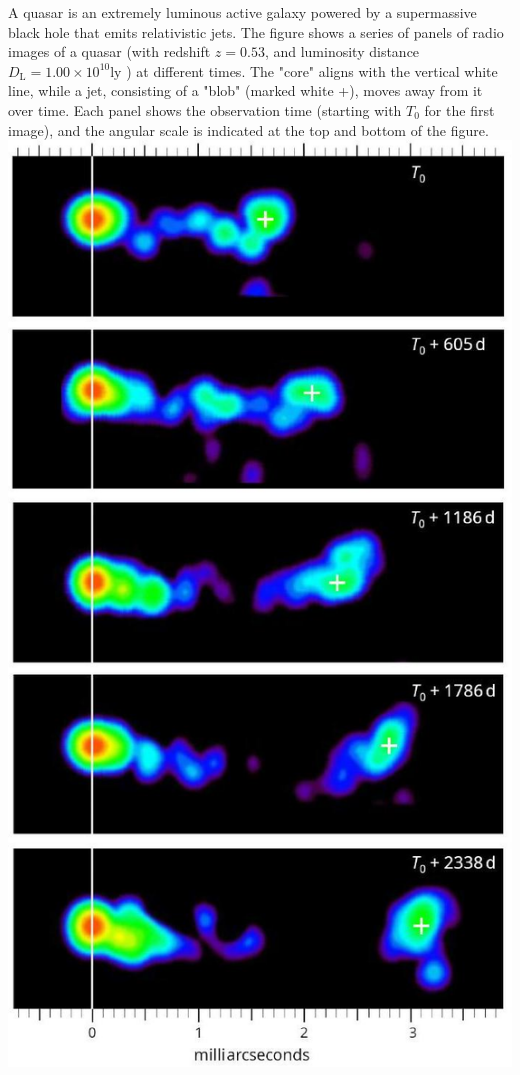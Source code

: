 \documentclass[10pt]{article}
\begin{document}
    A quasar is an extremely luminous active galaxy powered by a supermassive black hole that emits relativistic jets. The figure shows a series of panels of radio images of a quasar (with redshift $z=0.53$, and luminosity distance $D_{\mathrm{L}}=1.00 \times 10^{10} \mathrm{ly}$ ) at different times. The "core" aligns with the vertical white line, while a jet, consisting of a "blob" (marked white +), moves away from it over time. Each panel shows the observation time (starting with $T_{0}$ for the first image), and the angular scale is indicated at the top and bottom of the figure.\\
    \includegraphics[max width=\textwidth, center]{2025_08_23_e94579452776a99c4850g-03}\\
\end{document}
